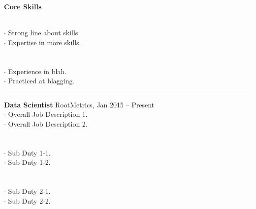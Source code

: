 \documentclass[letterpaper, onecolumn, oneside]{article}
\newcommand{\dotindent}{\hspace*{.25in}$\cdot$ }
\newcommand{\spaceindent}{\hspace*{0.1in}}
\begin{document}
\begin{flushleft}


\textbf{\large Core Skills}
\vspace*{0.05in}

\spaceindent {\bf Skill Set 1} \\
\dotindent Strong line about skills \\
\dotindent Expertise in more skills.\\
~\\

\spaceindent {\bf Skill Set 2} \\
\dotindent Experience in blah. \\
\dotindent Practiced at blagging. \\

\textcolor{litegrey}{\rule{\textwidth}{.1pt}}


\vspace*{0.1in}



\textbf{\large Data Scientist} RootMetrics, Jan 2015 -- Present \\
\dotindent Overall Job Description 1. \\
\dotindent Overall Job Description 2.\\
~\\

\spaceindent {\bf Major Sub Duty 1} \\
\dotindent Sub Duty 1-1.\\
\dotindent Sub Duty 1-2.\\
~\\

\spaceindent {\bf Major Sub Duty 2} \\
\dotindent Sub Duty 2-1.\\
\dotindent Sub Duty 2-2.\\
~\\


\end{flushleft}
\end{document}
